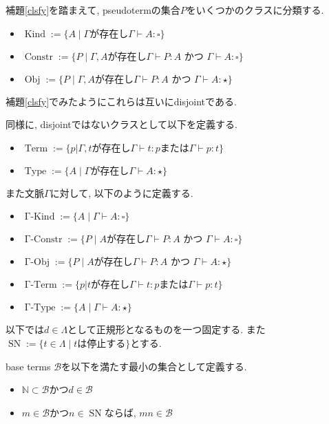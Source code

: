 \documentclass[12pt, titlepage]{ltjsarticle}
\DeclareMathOperator{\SN}{SN}
\DeclareMathOperator{\Term}{Term}
\DeclareMathOperator{\Obj}{Obj}
\DeclareMathOperator{\Constr}{Constr}
\DeclareMathOperator{\Type}{Type}
\DeclareMathOperator{\Kind}{Kind}
\DeclareMathOperator{\GTerm}{\Gamma-Term}
\DeclareMathOperator{\GObj}{\Gamma-Obj}
\DeclareMathOperator{\GConstr}{\Gamma-Constr}
\DeclareMathOperator{\GType}{\Gamma-Type}
\DeclareMathOperator{\GKind}{\Gamma-Kind}
\begin{document}
\begin{defn}
補題\ref{clsfy}を踏まえて, pseudotermの集合$P$をいくつかのクラスに分類する.
 \begin{itemize}
  \item $\Kind := \{ A \mid \Gamma \text{が存在し} \Gamma \vdash A \colon {\square}\}$
  \item $\Constr := \{ P \mid \Gamma, A \text{が存在し} \Gamma \vdash P \colon A \text{ かつ } \Gamma \vdash A \colon {\square}\}$
  \item $\Obj := \{ P \mid \Gamma, A \text{が存在し} \Gamma \vdash P \colon A \text{ かつ } \Gamma \vdash A \colon {\star}\}$
 \end{itemize}
 補題\ref{clsfy}でみたようにこれらは互いにdisjointである.

 同様に, disjointではないクラスとして以下を定義する.
 \begin{itemize}
  \item $\Term := \{p | \Gamma, t \text {が存在し} \Gamma \vdash t : p \text{または} \Gamma \vdash p : t \}$
  \item $\Type := \{ A \mid \Gamma \text{が存在し} \Gamma \vdash A \colon {\star}\}$
 \end{itemize}

また文脈$\Gamma$に対して, 以下のように定義する.
 \begin{itemize}
  \item $\GKind := \{ A \mid \Gamma \vdash A \colon {\square}\}$
  \item $\GConstr := \{ P \mid A \text{が存在し} \Gamma \vdash P \colon A \text{ かつ } \Gamma \vdash A \colon {\square}\}$
  \item $\GObj := \{ P \mid A \text{が存在し} \Gamma \vdash P \colon A \text{ かつ } \Gamma \vdash A \colon {\star}\}$
  \item $\GTerm := \{p | t \text {が存在し} \Gamma \vdash t : p \text{または} \Gamma \vdash p : t \}$
  \item $\GType := \{ A \mid \Gamma \vdash A \colon {\star}\}$
 \end{itemize}
\end{defn}

以下では$d \in \Lambda$として正規形となるものを一つ固定する. また$\SN := \{ t \in \Lambda \mid t \text{は停止する}\}$とする.

\begin{defn}
 base terms $\mathcal{B}$を以下を満たす最小の集合として定義する.
 \begin{itemize}
  \item $\mathbb{N} \subset \mathcal{B}$かつ$d \in \mathcal{B}$
  \item $m \in \mathcal{B}$かつ$n \in \SN$ならば, $mn \in \mathcal{B}$
 \end{itemize}
\end{defn}
\end{document}
